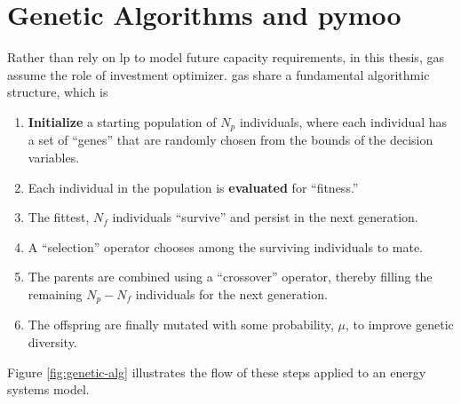 \section{Genetic Algorithms and \acs{pymoo}}
\label{section:genetic-algorithms}

Rather than rely on \ac{lp} to model future capacity requirements, in this thesis, \acp{ga} assume the role of investment optimizer. \acp{ga} share a fundamental 
algorithmic structure, which is \cite{blank_pymoo_2020}
\begin{enumerate}
    \item \textbf{Initialize} a starting population of $N_p$ individuals, where each 
    individual has a set of ``genes'' that are randomly chosen from the bounds of the 
    decision variables.
    \item Each individual in the population is \textbf{evaluated} for ``fitness.'' 
    \item The fittest, $N_f$ individuals ``survive'' and persist in the next generation.
    \item A ``selection'' operator chooses among the surviving individuals to mate.
    \item The parents are combined using a ``crossover'' operator, thereby filling the remaining $N_p - N_f$ individuals for the next generation.
    \item The offspring are finally mutated with some probability, $\mu$, to improve
    genetic diversity.
\end{enumerate}
\noindent
Figure \ref{fig:genetic-alg} illustrates the flow of these steps applied to
an energy systems model.

